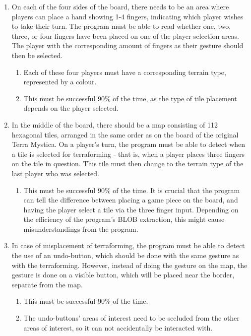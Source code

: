 \begin{enumerate}
\item On each of the four sides of the board, there needs to be an area where players can place a hand showing 1-4 fingers, indicating which player wishes to take their turn. The program must be able to read whether one, two, three, or four fingers have been placed on one of the player selection areas. The player with the corresponding amount of fingers as their gesture should then be selected.
	\begin{enumerate}
	\item Each of these four players must have a corresponding terrain type, represented by a colour.
	\item This must be successful 90\% of the time, as the type of tile placement depends on the player selected.
	\end{enumerate}
\item In the middle of the board, there should be a map consisting of 112 hexagonal tiles, arranged in the same order as on the board of the original Terra Mystica. On a player's turn, the program must be able to detect when a tile is selected for terraforming - that is, when a player places three fingers on the tile in question. This tile must then change to the terrain type of the last player who was selected.
	\begin{enumerate}
	\item This must be successful 90\% of the time. It is crucial that the program can tell the difference between placing a game piece on the board, and having the player select a tile via the three finger input. Depending on the efficiency of the program’s BLOB extraction, this might cause misunderstandings from the program.
	\end{enumerate}
\item In case of misplacement of terraforming, the program must be able to detect the use of an undo-button, which should be done with the same gesture as with the terraforming. However, instead of doing the gesture on the map, the gesture is done on a visible button, which will be placed near the border, separate from the map.
	\begin{enumerate}
	\item This must be successful 90\% of the time.
	\item The undo-buttons' areas of interest need to be secluded from the other areas of interest, so it can not accidentally be interacted with. 
	\end{enumerate}

\end{enumerate}
